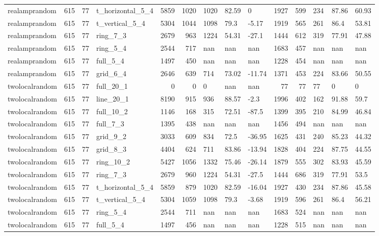 \begin{longtable}{lrrlrrlllrrlll}
realamprandom & 615 & 77 & t\_horizontal\_5\_4 & 5859 & 1020 & 1020 & 82.59 & 0 & 1927 & 599 & 234 & 87.86 & 60.93 \\
realamprandom & 615 & 77 & t\_vertical\_5\_4 & 5304 & 1044 & 1098 & 79.3 & -5.17 & 1919 & 565 & 261 & 86.4 & 53.81 \\
realamprandom & 615 & 77 & ring\_7\_3 & 2679 & 963 & 1224 & 54.31 & -27.1 & 1444 & 612 & 319 & 77.91 & 47.88 \\
realamprandom & 615 & 77 & ring\_5\_4 & 2544 & 717 & nan & nan & nan & 1683 & 457 & nan & nan & nan \\
realamprandom & 615 & 77 & full\_5\_4 & 1497 & 450 & nan & nan & nan & 1228 & 454 & nan & nan & nan \\
realamprandom & 615 & 77 & grid\_6\_4 & 2646 & 639 & 714 & 73.02 & -11.74 & 1371 & 453 & 224 & 83.66 & 50.55 \\
twolocalrandom & 615 & 77 & full\_20\_1 & 0 & 0 & 0 & nan & nan & 77 & 77 & 77 & 0 & 0 \\
twolocalrandom & 615 & 77 & line\_20\_1 & 8190 & 915 & 936 & 88.57 & -2.3 & 1996 & 402 & 162 & 91.88 & 59.7 \\
twolocalrandom & 615 & 77 & full\_10\_2 & 1146 & 168 & 315 & 72.51 & -87.5 & 1399 & 395 & 210 & 84.99 & 46.84 \\
twolocalrandom & 615 & 77 & full\_7\_3 & 1395 & 438 & nan & nan & nan & 1456 & 494 & nan & nan & nan \\
twolocalrandom & 615 & 77 & grid\_9\_2 & 3033 & 609 & 834 & 72.5 & -36.95 & 1625 & 431 & 240 & 85.23 & 44.32 \\
twolocalrandom & 615 & 77 & grid\_8\_3 & 4404 & 624 & 711 & 83.86 & -13.94 & 1828 & 404 & 224 & 87.75 & 44.55 \\
twolocalrandom & 615 & 77 & ring\_10\_2 & 5427 & 1056 & 1332 & 75.46 & -26.14 & 1879 & 555 & 302 & 83.93 & 45.59 \\
twolocalrandom & 615 & 77 & ring\_7\_3 & 2679 & 960 & 1224 & 54.31 & -27.5 & 1444 & 686 & 319 & 77.91 & 53.5 \\
twolocalrandom & 615 & 77 & t\_horizontal\_5\_4 & 5859 & 879 & 1020 & 82.59 & -16.04 & 1927 & 430 & 234 & 87.86 & 45.58 \\
twolocalrandom & 615 & 77 & t\_vertical\_5\_4 & 5304 & 1059 & 1098 & 79.3 & -3.68 & 1919 & 596 & 261 & 86.4 & 56.21 \\
twolocalrandom & 615 & 77 & ring\_5\_4 & 2544 & 711 & nan & nan & nan & 1683 & 524 & nan & nan & nan \\
twolocalrandom & 615 & 77 & full\_5\_4 & 1497 & 456 & nan & nan & nan & 1228 & 515 & nan & nan & nan \\

\end{longtable}
